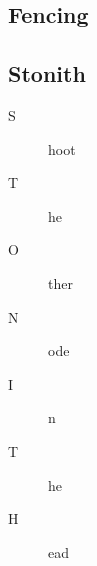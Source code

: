 \subsection{Fencing}
\subsection{Stonith}
\begin{description}
\item[S]hoot
\item[T]he
\item[O]ther
\item[N]ode
\item[I]n
\item[T]he 
\item[H]ead
\end{description}